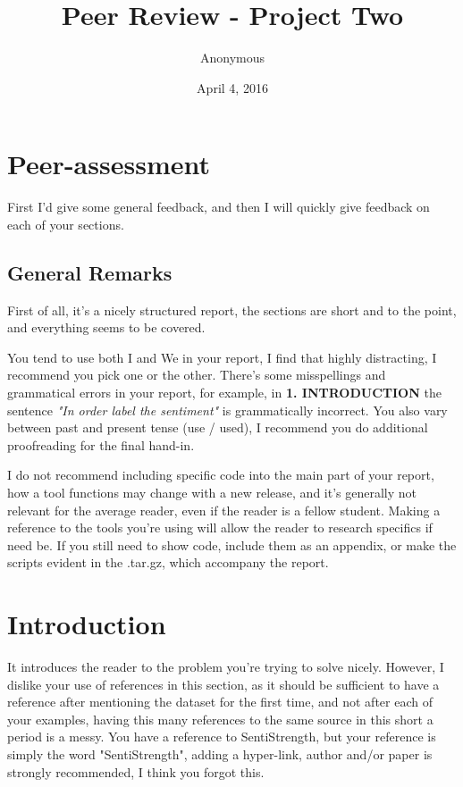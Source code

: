 \documentclass[11pt]{article} %
\title{Peer Review - Project Two}
\author{Anonymous}
\begin{document}
\date{April 4, 2016}
\maketitle

\section*{Peer-assessment}
First I'd give some general feedback, and then I will quickly give feedback on each of your sections.
\subsection*{General Remarks}
First of all, it's a nicely structured report, the sections are short and to the point, and everything seems to be covered.

You tend to use both I and We in your report, I find that highly distracting, I recommend you pick one or the other. There's some misspellings and grammatical errors in your report, for example, in \textbf{1. INTRODUCTION} the sentence \textit{"In order label the sentiment"} is grammatically incorrect. You also vary between past and present tense (use / used), I recommend you do additional proofreading for the final hand-in.

I do not recommend including specific code into the main part of your report, how a tool functions may change with a new release, and it's generally not relevant for the average reader, even if the reader is a fellow student. Making a reference to the tools you're using will allow the reader to research specifics if need be. If you still need to show code, include them as an appendix, or make the scripts evident in the .tar.gz, which accompany the report.

\section*{Introduction}
It introduces the reader to the problem you're trying to solve nicely. However, I dislike your use of references in this section, as it should be sufficient to have a reference after mentioning the dataset for the first time, and not after each of your examples, having this many references to the same source in this short a period is a messy. You have a reference to SentiStrength, but your reference is simply the word "SentiStrength", adding a hyper-link, author and/or paper is strongly recommended, I think you forgot this.
\end{document}
